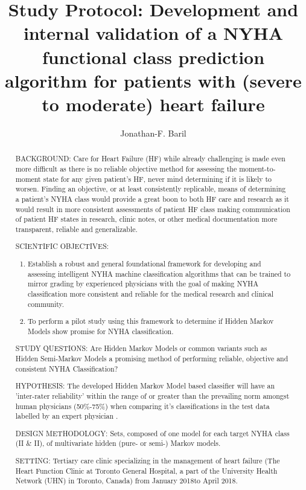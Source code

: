 \documentclass[]{article}
\title{Study Protocol:
	\linebreak
	Development and internal validation of a NYHA functional class prediction algorithm for patients with (severe to moderate) heart failure}  %
\author{Jonathan-F. Baril}
\newcommand{\STUDYSTARTDATE}{January 2018}
\newcommand{\STUDYENDDATE}{April 2018}
\begin{document}
\maketitle

\clearpage

\begin{abstract} %
\noindent BACKGROUND: Care for Heart Failure (HF) while already challenging is made even more difficult as there is no reliable objective method for assessing the moment-to-moment state for any given patient’s HF, never mind determining if it is likely to worsen. Finding an objective, or at least consistently replicable, means of determining a patient's NYHA class would provide a great boon to both HF care and research as it would result in more consistent assessments of patient HF class making communication of patient HF states in research, clinic notes, or other medical documentation more transparent, reliable and generalizable.

\noindent SCIENTIFIC OBJECTIVES: 
\begin{enumerate}
	\item Establish a robust and general foundational framework for developing and assessing intelligent NYHA machine classification algorithms that can be trained to mirror grading by experienced physicians with the goal of making NYHA classification more consistent and reliable for the medical research and clinical community.
	\item To perform a pilot study using this framework to determine if Hidden Markov Models show promise for NYHA classification.
\end{enumerate}

\noindent STUDY QUESTIONS: Are Hidden Markov Models or common variants such as Hidden Semi-Markov Models a promising method of performing reliable, objective and consistent NYHA Classification?

\noindent HYPOTHESIS: The developed Hidden Markov Model based classifier will have an 'inter-rater reliability' within the range of or greater than the prevailing norm amongst human physicians (50\%-75\%) when comparing it's classifications in the test data labelled by an expert physician \cite{Carroll2014,Goldman1981a,Christensen2006,Raphael2007a,Kubo2004}.

\noindent DESIGN METHODOLOGY: Sets, composed of one model for each target NYHA class (II \& II), of multivariate hidden (pure- or semi-) Markov models. 

\noindent SETTING: Tertiary care clinic specializing in the management of heart failure (The Heart Function Clinic at Toronto General Hospital, a part of the University Health Network (UHN) in Toronto, Canada) from \STUDYSTARTDATE to \STUDYENDDATE.


\end{abstract}
\end{document}

